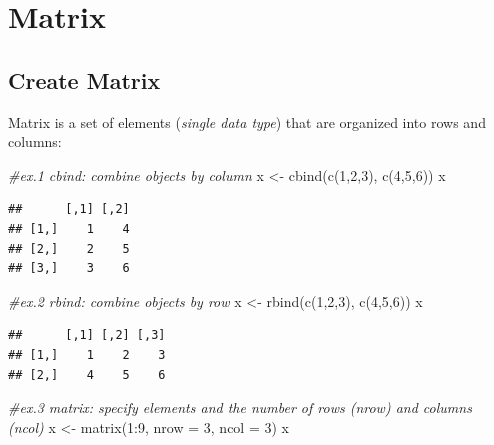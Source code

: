 \documentclass[
]{book}
\newenvironment{Shaded}{\begin{snugshade}}{\end{snugshade}}
\newcommand{\AttributeTok}[1]{\textcolor[rgb]{0.77,0.63,0.00}{#1}}
\newcommand{\CommentTok}[1]{\textcolor[rgb]{0.56,0.35,0.01}{\textit{#1}}}
\newcommand{\DecValTok}[1]{\textcolor[rgb]{0.00,0.00,0.81}{#1}}
\newcommand{\FunctionTok}[1]{\textcolor[rgb]{0.00,0.00,0.00}{#1}}
\newcommand{\NormalTok}[1]{#1}
\newcommand{\OtherTok}[1]{\textcolor[rgb]{0.56,0.35,0.01}{#1}}
\newcommand{\SpecialCharTok}[1]{\textcolor[rgb]{0.00,0.00,0.00}{#1}}
\begin{document}
\hypertarget{matrix}{%
\section{Matrix}\label{matrix}}

\hypertarget{create-matrix}{%
\subsection{Create Matrix}\label{create-matrix}}

Matrix is a set of elements (\emph{single data type}) that are organized into rows and columns:

\begin{Shaded}
\begin{Highlighting}[]
\CommentTok{\#ex.1 cbind: combine objects by column}
\NormalTok{x }\OtherTok{\textless{}{-}} \FunctionTok{cbind}\NormalTok{(}\FunctionTok{c}\NormalTok{(}\DecValTok{1}\NormalTok{,}\DecValTok{2}\NormalTok{,}\DecValTok{3}\NormalTok{), }\FunctionTok{c}\NormalTok{(}\DecValTok{4}\NormalTok{,}\DecValTok{5}\NormalTok{,}\DecValTok{6}\NormalTok{))}
\NormalTok{x}
\end{Highlighting}
\end{Shaded}

\begin{verbatim}
##      [,1] [,2]
## [1,]    1    4
## [2,]    2    5
## [3,]    3    6
\end{verbatim}

\begin{Shaded}
\begin{Highlighting}[]
\CommentTok{\#ex.2 rbind: combine objects by row}
\NormalTok{x }\OtherTok{\textless{}{-}} \FunctionTok{rbind}\NormalTok{(}\FunctionTok{c}\NormalTok{(}\DecValTok{1}\NormalTok{,}\DecValTok{2}\NormalTok{,}\DecValTok{3}\NormalTok{), }\FunctionTok{c}\NormalTok{(}\DecValTok{4}\NormalTok{,}\DecValTok{5}\NormalTok{,}\DecValTok{6}\NormalTok{))}
\NormalTok{x}
\end{Highlighting}
\end{Shaded}

\begin{verbatim}
##      [,1] [,2] [,3]
## [1,]    1    2    3
## [2,]    4    5    6
\end{verbatim}

\begin{Shaded}
\begin{Highlighting}[]
\CommentTok{\#ex.3 matrix: specify elements and the number of rows (nrow) and columns (ncol)}
\NormalTok{x }\OtherTok{\textless{}{-}} \FunctionTok{matrix}\NormalTok{(}\DecValTok{1}\SpecialCharTok{:}\DecValTok{9}\NormalTok{, }\AttributeTok{nrow =} \DecValTok{3}\NormalTok{, }\AttributeTok{ncol =} \DecValTok{3}\NormalTok{)}
\NormalTok{x}
\end{Highlighting}
\end{Shaded}
\end{document}

